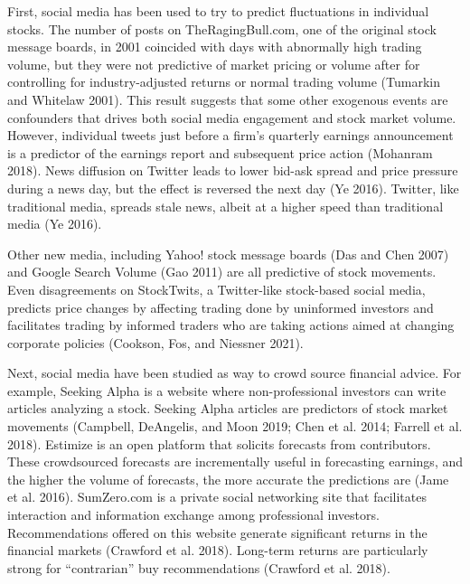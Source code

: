 \documentclass[12pt,]{article}
\begin{document}
First, social media has been used to try to predict fluctuations in
individual stocks. The number of posts on TheRagingBull.com, one of the
original stock message boards, in 2001 coincided with days with
abnormally high trading volume, but they were not predictive of market
pricing or volume after for controlling for industry-adjusted returns or
normal trading volume (Tumarkin and Whitelaw 2001). This result suggests
that some other exogenous events are confounders that drives both social
media engagement and stock market volume. However, individual tweets
just before a firm's quarterly earnings announcement is a predictor of
the earnings report and subsequent price action (Mohanram 2018). News
diffusion on Twitter leads to lower bid-ask spread and price pressure
during a news day, but the effect is reversed the next day (Ye 2016).
Twitter, like traditional media, spreads stale news, albeit at a higher
speed than traditional media (Ye 2016).

Other new media, including Yahoo! stock message boards (Das and Chen
2007) and Google Search Volume (Gao 2011) are all predictive of stock
movements. Even disagreements on StockTwits, a Twitter-like stock-based
social media, predicts price changes by affecting trading done by
uninformed investors and facilitates trading by informed traders who are
taking actions aimed at changing corporate policies (Cookson, Fos, and
Niessner 2021).

Next, social media have been studied as way to crowd source financial
advice. For example, Seeking Alpha is a website where non-professional
investors can write articles analyzing a stock. Seeking Alpha articles
are predictors of stock market movements (Campbell, DeAngelis, and Moon
2019; Chen et al. 2014; Farrell et al. 2018). Estimize is an open
platform that solicits forecasts from contributors. These crowdsourced
forecasts are incrementally useful in forecasting earnings, and the
higher the volume of forecasts, the more accurate the predictions are
(Jame et al. 2016). SumZero.com is a private social networking site that
facilitates interaction and information exchange among professional
investors. Recommendations offered on this website generate significant
returns in the financial markets (Crawford et al. 2018). Long-term
returns are particularly strong for ``contrarian'' buy recommendations
(Crawford et al. 2018).
\end{document}
